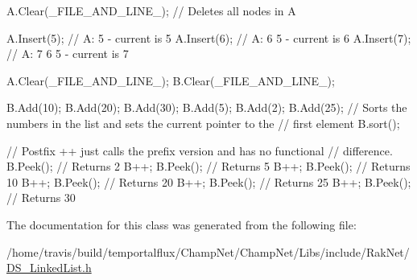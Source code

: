 \begin{DoxyCode}
A.Clear(\_FILE\_AND\_LINE\_);  \textcolor{comment}{// Deletes all nodes in A}

A.Insert(5);  \textcolor{comment}{// A: 5 - current is 5}
A.Insert(6); \textcolor{comment}{// A: 6 5 - current is 6}
A.Insert(7); \textcolor{comment}{// A: 7 6 5 - current is 7}

A.Clear(\_FILE\_AND\_LINE\_);
B.Clear(\_FILE\_AND\_LINE\_);

B.Add(10);
B.Add(20);
B.Add(30);
B.Add(5);
B.Add(2);
B.Add(25);
\textcolor{comment}{// Sorts the numbers in the list and sets the current pointer to the }
\textcolor{comment}{// first element}
B.sort();  

\textcolor{comment}{// Postfix ++ just calls the prefix version and has no functional }
\textcolor{comment}{// difference.}
B.Peek();  \textcolor{comment}{// Returns 2}
B++;
B.Peek();  \textcolor{comment}{// Returns 5}
B++;
B.Peek();  \textcolor{comment}{// Returns 10}
B++;
B.Peek();  \textcolor{comment}{// Returns 20}
B++;
B.Peek();  \textcolor{comment}{// Returns 25}
B++;
B.Peek();  \textcolor{comment}{// Returns 30}
\end{DoxyCode}
 

The documentation for this class was generated from the following file\-:\begin{DoxyCompactItemize}
\item 
/home/travis/build/temportalflux/\-Champ\-Net/\-Champ\-Net/\-Libs/include/\-Rak\-Net/\hyperlink{_d_s___linked_list_8h}{D\-S\-\_\-\-Linked\-List.\-h}\end{DoxyCompactItemize}
